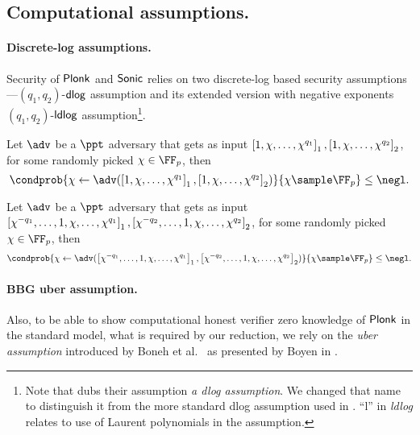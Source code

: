 \documentclass[runningheads,11pt]{llncs}
\begin{document}
\subsection{Computational assumptions.}

\paragraph{Discrete-log assumptions.}
Security of $\textnormal{\textsf{Plonk}}$ and ${\textnormal{\textsf{Sonic}}}$ relies on two discrete-log based security
assumptions---$(q_1, q_2)$-$\mathsf{dlog}$ assumption and its extended version with negative
exponents $(q_1, q_2)$-$\mathsf{ldlog}$ assumption\footnote{Note that
  \cite{CCS:MBKM19} dubs their assumption \emph{a dlog assumption}. We changed
  that name to distinguish it from the more standard dlog assumption used in
  \cite{EPRINT:GabWilCio19}. ``l'' in \emph{ldlog} relates to use of Laurent
  polynomials in the assumption.}.

\begin{definition}
	Let $\adv$ be a $\ppt$ adversary that gets as input
  $\left[1, \chi, \ldots, \chi^{q_1}\right]_{1}, \left[1, \chi, \ldots, \chi^{q_2}\right]_{2}$, for
  some randomly picked $\chi \in \FF_p$, then
	\[
		\condprob{\chi \gets \adv(\gone{1, \chi, \ldots, \chi^{q_1}}, \gtwo{1, \chi,
        \ldots, \chi^{q_2} })}{\chi \sample \FF_p} \leq \negl.
	\]
\end{definition}

\begin{definition}
  Let $\adv$ be a $\ppt$ adversary that gets as input
  $\left[\chi^{-q_1}, \ldots, 1, \chi, \ldots, \chi^{q_1}\right]_{1}, \left[\chi^{-q_2},
    \ldots, 1, \chi, \ldots, \chi^{q_2}\right]_{2}$, for some randomly picked
  $\chi \in \FF_p$, then
	\[
    \condprob{\chi \gets \adv(\gone{\chi^{-q_1}, \ldots, 1, \chi, \ldots,
        \chi^{q_1}}, \gtwo{\chi^{-q_2}, \ldots, 1, \chi, \ldots, \chi^{q_2}
      })}{\chi \sample \FF_p} \leq \negl.
	\]
\end{definition}

\paragraph{BBG uber assumption.}
Also, to be able to show computational honest verifier zero knowledge of
$\textnormal{\textsf{Plonk}}$ in the standard model, what is required by our reduction, we rely on the
\emph{uber assumption} introduced by Boneh et
al.~\cite{EC:BonBoyGoh05} as presented by Boyen in \cite{PAIRING:Boyen08}.
\end{document}
